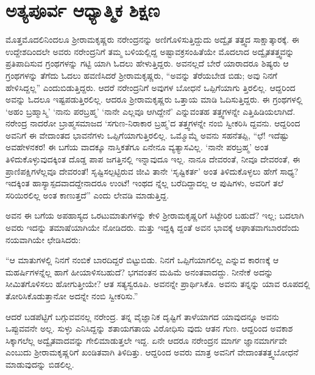 
\chapter{ಅತ್ಯಪೂರ್ವ ಆಧ್ಯಾತ್ಮಿಕ ಶಿಕ್ಷಣ}

\noindent

ಮೊತ್ತಮೊದಲಿನಿಂದಲೂ ಶ್ರೀರಾಮಕೃಷ್ಣರು ನರೇಂದ್ರನನ್ನು ಅಣಿಗೊಳಿಸುತ್ತಿದ್ದುದು ಅದ್ವೈತ ತತ್ತ್ವದ ಸಾಕ್ಷಾತ್ಕಾರಕ್ಕೆ. ಈ ಉದ್ದೇಶದಿಂದಲೇ ಅವರು ನರೇಂದ್ರನಿಗೆ ತಮ್ಮ ಬಳಿಯಲ್ಲಿದ್ದ ಅಷ್ಟಾವಕ್ರಸಂಹಿತೆಯೇ ಮೊದಲಾದ ಅದ್ವೈತತತ್ತ್ವವನ್ನು ಪ್ರತಿಪಾದಿಸುವ ಗ್ರಂಥಗಳನ್ನು ಗಟ್ಟಿ ಯಾಗಿ ಓದಲು ಹೇಳುತ್ತಿದ್ದರು. ಅವನಲ್ಲದೆ ಬೇರೆ ಯಾರಾದರೂ ಶಿಷ್ಯರು ಆ ಗ್ರಂಥಗಳನ್ನು ತೆಗೆದು ಓದಲು ಹವಣಿಸಿದರೆ ಶ್ರೀರಾಮಕೃಷ್ಣರು, “ಅವನ್ನು ತೆರೆಯಬೇಡ ಬಿಡು; ಅವು ನಿನಗೆ ಹೇಳಿಸಿದ್ದಲ್ಲ” ಎಂದುಬಿಡುತ್ತಿದ್ದರು. ಆದರೆ ನರೇಂದ್ರನಿಗೆ ಅವುಗಳ ಬೋಧನೆ ಒಪ್ಪಿಗೆಯಾಗು ತ್ತಿರಲಿಲ್ಲ. ಆದ್ದರಿಂದ ಅವನ್ನು ಓದಲೂ ಇಷ್ಟಪಡುತ್ತಿರಲಿಲ್ಲ. ಆದರೂ ಶ್ರೀರಾಮಕೃಷ್ಣರು ಒತ್ತಾಯ ಮಾಡಿ ಓದಿಸುತ್ತಿದ್ದರು. ಈ ಗ್ರಂಥಗಳಲ್ಲಿ ‘ಅಹಂ ಬ್ರಹ್ಮಾಸ್ಮಿ’ ‘ನಾನು ಪರಬ್ರಹ್ಮ’ ‘ನಾನೇ ಎಲ್ಲವೂ ಆಗಿದ್ದೇನೆ’ ಎನ್ನುವಂತಹ ತತ್ತ್ವಗಳನ್ನೇ ಎತ್ತಿಹಿಡಿಯಲಾಗಿದೆ. ನರೇಂದ್ರ ನಾದರೋ ಬ್ರಾಹ್ಮಸಮಾಜದ ‘ಸಗುಣ-ನಿರಾಕಾರ ಬ್ರಹ್ಮ’ದ ತತ್ತ್ವಗಳನ್ನೇ ನಂಬಿ ಸ್ವೀಕರಿಸಿ ದ್ದವನು. ಆದ್ದರಿಂದ ಅವನಿಗೆ ಈ ವೇದಾಂತದ ಭಾವನೆಗಳು ಒಪ್ಪಿಗೆಯಾಗುತ್ತಿರಲಿಲ್ಲ. ಒಮ್ಮೊಮ್ಮೆ ಅವನು ಸಹನೆತಪ್ಪಿ, “ಛೆ! ಇದೆಷ್ಟು ಅವಹೇಳನಕರ! ಈ ಬಗೆಯ ವಾದಕ್ಕೂ ನಾಸ್ತಿಕತೆಗೂ ಏನೇನೂ ವ್ಯತ್ಯಾಸವಿಲ್ಲ. ‘ನಾನೇ ಪರಬ್ರಹ್ಮ’ ಅಂತ ತಿಳಿದುಕೊಳ್ಳುವುದಕ್ಕಿಂತ ದೊಡ್ಡ ಪಾಪ ಜಗತ್ತಿನಲ್ಲಿ ಇನ್ನಾವುದೂ ಇಲ್ಲ. ನಾನೂ ದೇವರಂತೆ, ನೀವೂ ದೇವರಂತೆ, ಈ ಪ್ರಾಣಿಪಕ್ಷಿಗಳೆಲ್ಲವೂ ದೇವರಂತೆ! ಸೃಷ್ಟಿಸಲ್ಪಟ್ಟಿರುವ ಜೀವಿ ತಾನೇ ‘ಸೃಷ್ಟಿಕರ್ತ’ ಅಂತ ತಿಳಿದುಕೊಳ್ಳಲು ಹೇಗೆ ಸಾಧ್ಯ? ಇದಕ್ಕಿಂತ ಹಾಸ್ಯಾಸ್ಪದವಾದದ್ದೇನಾದರೂ ಉಂಟೆ! ಇಂಥದ ನ್ನೆಲ್ಲ ಬರೆದಿದ್ದಾದಲ್ಲ ಆ ಪುಷಿಗಳು, ಅವರಿಗೆ ತಲೆ ಸರಿಯಿರಲಿಲ್ಲ ಅಂತ ಕಾಣುತ್ತದೆ” ಎಂದು ಲೇವಡಿ ಮಾಡುತ್ತಿದ್ದ.

ಅವನ ಈ ಬಗೆಯ ಅಪಹಾಸ್ಯದ ಒರಟುಮಾತುಗಳನ್ನು ಕೇಳಿ ಶ್ರೀರಾಮಕೃಷ್ಣರಿಗೆ ಸಿಟ್ಟೇರಿರ ಬಹುದೆ? ಇಲ್ಲ; ಬದಲಾಗಿ ಅವರು ಇದನ್ನು ತಮಾಷೆಯಾಗಿಯೇ ನೋಡಿದರು. ಮತ್ತು ಇದ್ದಕ್ಕಿ ದ್ದಂತೆ ಅವನ ಭಾವಕ್ಕೆ ಆಘಾತವಾಗಬಾರದೆಂದು ನಯವಾಗಿಯೇ ಛೇಡಿಸಿದರು:

“ಆ ಮಾತುಗಳಲ್ಲಿ ನಿನಗೆ ನಂಬಿಕೆ ಬಾರದಿದ್ದರೆ ಬಿಟ್ಟುಬಿಡು. ನಿನಗೆ ಒಪ್ಪಿಗೆಯಾಗಲಿಲ್ಲ ಎನ್ನುವ ಕಾರಣಕ್ಕೆ ಆ ಮಹರ್ಷಿಗಳನ್ನೆಲ್ಲ ಹಾಗೆ ಹೀಯಾಳಿಸಬಹುದೆ? ಭಗವಂತನ ಮಹಿಮೆ ಅನಂತವಾದದ್ದು. ನೀನೇಕೆ ಅದನ್ನು ಸೀಮಿತಗೊಳಿಸಲು ಹೋಗುತ್ತೀಯೇ? ಆತ ಸತ್ಯಸ್ವರೂಪಿ. ಅವನನ್ನೇ ಪ್ರಾರ್ಥಿಸಿಕೊ. ಅವನು ತನ್ನನ್ನು ಯಾವ ರೂಪದಲ್ಲಿ ತೋರಿಸಿಕೊಡುತ್ತಾನೋ ಅದನ್ನೇ ನಂಬಿ ಸ್ವೀಕರಿಸು.”

ಆದರೆ ಬಡಪೆಟ್ಟಿಗೆ ಬಗ್ಗುವವನಲ್ಲ ನರೇಂದ್ರ. ತನ್ನ ವೈಜ್ಞಾನಿಕ ದೃಷ್ಟಿಗೆ ತಾಳೆಯಾಗದ ಯಾವುದನ್ನೂ ಅವನು ಒಪ್ಪುವವನೇ ಅಲ್ಲ. ಸುಳ್ಳು ಎನಿಸಿದ್ದನ್ನು ಶತಾಯಗತಾಯ ವಿರೋಧಿಸು ವುದು ಆತನ ಗುಣ. ಆದ್ದರಿಂದ ಅವಕಾಶ ಸಿಕ್ಕಾಗಲೆಲ್ಲ ಅದ್ವೈತವಾದವನ್ನು ಗೇಲಿಮಾಡುತ್ತಲೇ ಇದ್ದ. ಏನೇ ಆದರೂ ನರೇಂದ್ರನ ಮಾರ್ಗ ಜ್ಞಾನಮಾರ್ಗವೇ ಎಂಬುದು ಶ್ರೀರಾಮಕೃಷ್ಣರಿಗೆ ಖಂಡಿತವಾಗಿ ತಿಳಿದಿತ್ತು. ಆದ್ದರಿಂದ ಅವರು ಮಾತ್ರ ಅವನಿಗೆ ವೇದಾಂತತತ್ತ್ವಬೋಧನೆ ಮಾಡುವುದನ್ನು ಬಿಡಲಿಲ್ಲ.

